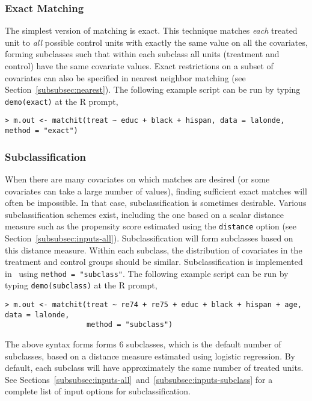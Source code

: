 \subsubsection{Exact Matching}
\label{subsubsec:exact}

The simplest version of matching is exact.  This technique matches
\emph{each} treated unit to \emph{all} possible control units with
exactly the same value on all the covariates, forming subclasses such
that within each subclass all units (treatment and control) have the
same covariate values.  Exact restrictions on a subset of covariates
can also be specified in nearest neighbor matching (see
Section~\ref{subsubsec:nearest}).  The following example script can be
run by typing {\tt demo(exact)} at the R prompt,
\begin{verbatim}
> m.out <- matchit(treat ~ educ + black + hispan, data = lalonde, method = "exact")
\end{verbatim}

\subsubsection{Subclassification}
\label{subsubsec:subclass}

When there are many covariates on which matches are desired (or some
covariates can take a large number of values), finding sufficient
exact matches will often be impossible.  In that case,
subclassification is sometimes desirable. Various subclassification
schemes exist, including the one based on a scalar distance measure
such as the propensity score estimated using the \texttt{distance}
option (see Section~\ref{subsubsec:inputs-all}).  Subclassification
will form subclasses based on this distance measure.  Within each
subclass, the distribution of covariates in the treatment and control
groups should be similar.  Subclassification is implemented in
\MatchIt\ using \texttt{method = "subclass"}.
The following example script can be run by typing {\tt demo(subclass)}
at the R prompt,
\begin{verbatim}
> m.out <- matchit(treat ~ re74 + re75 + educ + black + hispan + age, data = lalonde, 
                   method = "subclass")
\end{verbatim}
The above syntax forms forms 6 subclasses, which is the default number
of subclasses, based on a distance measure estimated using logistic
regression.  By default, each subclass will have approximately the
same number of treated units.  See
Sections~\ref{subsubsec:inputs-all}~and~\ref{subsubsec:inputs-subclass}
for a complete list of input options for subclassification.

